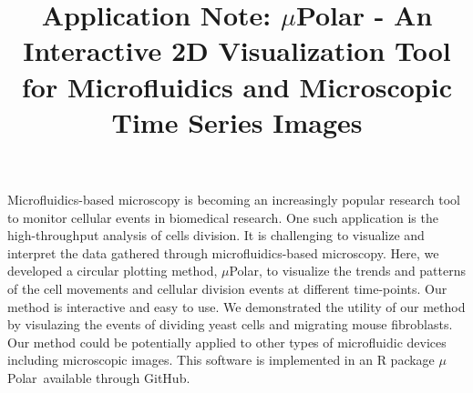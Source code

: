 \documentclass[conference]{IEEEtran}
\begin{document}
\title{ Application Note: $\mu$Polar \-- An Interactive 2D Visualization Tool for  Microfluidics and  Microscopic Time Series Images }


\maketitle


\begin{Summary}

Microfluidics-based microscopy is becoming an increasingly popular research tool to monitor cellular events in biomedical research. One such application is the high-throughput analysis of cells division. It is challenging to visualize and interpret the data gathered through microfluidics-based microscopy. Here, we developed a circular plotting method, $\mu$Polar, to visualize the trends and patterns of the cell movements and cellular division events at different time-points. Our method is interactive and easy to use. We demonstrated the utility of our method by visulazing the  events of dividing yeast cells and migrating mouse fibroblasts. Our method could be potentially applied to other types of microfluidic devices including microscopic images. This software is implemented in an R package $\mu$Polar\ available through GitHub.


\end{Summary}
\end{document}
